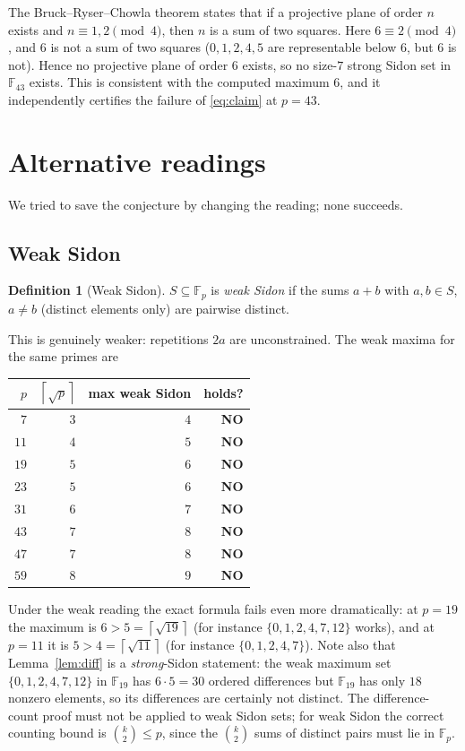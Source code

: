 \documentclass[11pt]{article}
\theoremstyle{definition}
\newtheorem{definition}[theorem]{Definition}
\theoremstyle{remark}
\newcommand{\F}{\mathbb{F}}
\newcommand{\ceil}[1]{\left\lceil #1 \right\rceil}
\begin{document}
The Bruck--Ryser--Chowla theorem states that if a projective plane of order
$n$ exists and $n \equiv 1, 2 \pmod 4$, then $n$ is a sum of two squares. Here
$6 \equiv 2 \pmod 4$, and $6$ is not a sum of two squares ($0,1,2,4,5$ are
representable below $6$, but $6$ is not). Hence no projective plane of order
$6$ exists, so no size-$7$ strong Sidon set in $\F_{43}$ exists. This is
consistent with the computed maximum $6$, and it independently certifies the
failure of \eqref{eq:claim} at $p = 43$.

\section{Alternative readings}\label{sec:readings}

We tried to save the conjecture by changing the reading; none succeeds.

\subsection*{Weak Sidon}

\begin{definition}[Weak Sidon]
$S \subseteq \F_p$ is \emph{weak Sidon} if the sums $a+b$ with $a,b \in S$,
$a \ne b$ (distinct elements only) are pairwise distinct.
\end{definition}

This is genuinely weaker: repetitions $2a$ are unconstrained. The weak maxima
for the same primes are

\begin{center}
\begin{tabular}{r r r r}
\toprule
$p$ & $\ceil{\sqrt p}$ & max weak Sidon & holds? \\
\midrule
$7$  & $3$ & $4$  & \textbf{NO} \\
$11$ & $4$ & $5$  & \textbf{NO} \\
$19$ & $5$ & $6$  & \textbf{NO} \\
$23$ & $5$ & $6$  & \textbf{NO} \\
$31$ & $6$ & $7$  & \textbf{NO} \\
$43$ & $7$ & $8$  & \textbf{NO} \\
$47$ & $7$ & $8$  & \textbf{NO} \\
$59$ & $8$ & $9$  & \textbf{NO} \\
\bottomrule
\end{tabular}
\end{center}

Under the weak reading the exact formula fails even more dramatically: at
$p = 19$ the maximum is $6 > 5 = \ceil{\sqrt{19}}$ (for instance
$\{0,1,2,4,7,12\}$ works), and at $p = 11$ it is $5 > 4 = \ceil{\sqrt{11}}$
(for instance $\{0,1,2,4,7\}$). Note also that Lemma~\ref{lem:diff} is a
\emph{strong}-Sidon statement: the weak maximum set $\{0,1,2,4,7,12\}$ in
$\F_{19}$ has $6 \cdot 5 = 30$ ordered differences but $\F_{19}$ has only $18$
nonzero elements, so its differences are certainly not distinct. The
difference-count proof must not be applied to weak Sidon sets; for weak Sidon
the correct counting bound is $\binom{k}{2} \le p$, since the $\binom{k}{2}$
sums of distinct pairs must lie in $\F_p$.
\end{document}
